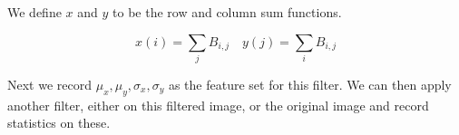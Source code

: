 We define $x$ and $y$ to be the row and column sum functions.

\begin{equation}
x(i) = \sum_{j}{B_{i,j}} \quad
y(j) = \sum_{i}{B_{i,j}}
\end{equation}

Next we record $\mu_x, \mu_y, \sigma_x, \sigma_y$ as the feature set for this filter.
We can then apply another filter, either on this filtered image, or the original image
and record statistics on these.
